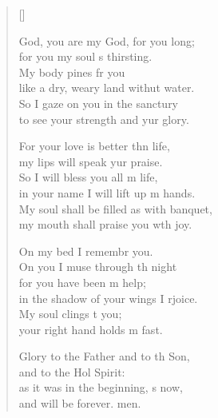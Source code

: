 \settowidth{\versewidth}{My soul shall be filled as with a banquet,    *}
\begin{verse}[\versewidth]
  \begin{patverse}
     God, you are my God, for you  long;\Med\\
for you my soul \pointup{\i}s thirsting.\\
My body pines fr you\Med\\
like a dry, weary land withut water.\\
So I gaze on you in the sanctury\Med\\
to see your strength and yur glory.

For your love is better thn life,\Med\\
my lips will speak yur praise.\\
So I will bless you all m life,\Med\\
in your name I will lift up m hands.\\
My soul shall be filled as with  banquet,\Med\\
my mouth shall praise you w\pointup{\i}th joy.

On my bed I remembr you.\Med\\
On you I muse through th night\\
for you have been m help;\Med\\
in the shadow of your wings I rjoice.\\
My soul clings t you;\Med\\
your right hand holds m fast.

Glory to the Father and to th Son,\Med\\
and to the Hol Spirit:\\
as it was in the beginning, \pointup{\i}s now,\Med\\
and will be forever. men.
  \end{patverse}
\end{verse}
